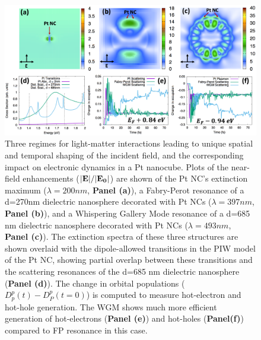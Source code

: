 \documentclass[journal=jpclcd,manuscript=article]{achemso}
\begin{document}
\begin{figure}
\begin{center}
\includegraphics[width=6in]{figs/Pt_AllThree_Alternate.png}
\caption{Three regimes for light-matter interactions leading to unique
spatial and temporal shaping of the incident field, and the corresponding
impact on electronic dynamics in a Pt nanocube. Plots of the near-field enhancements (${\bf |E|}/{\bf |E_0|}$) are shown of the
Pt NC's extinction maximum ($\lambda=200 nm$, {\bf Panel (a)}), a Fabry-Perot resonance of a d=270nm dielectric nanosphere decorated with Pt NCs
($\lambda = 397 nm$, {\bf Panel (b)}),
and a Whispering Gallery Mode resonance of a d=685 nm dielectric nanosphere decorated with Pt NCs ($\lambda = 493 nm$, {\bf Panel (c)}).
The extinction spectra of these three structures are shown overlaid with the dipole-allowed transitions in the PIW model of the Pt NC, showing partial
overlap between these transitions and the scattering resonances of the d=685 nm dielectric nanosphere ({\bf Panel (d)}).
The change in orbital populations ($D_p^p(t)-D_P^p(t=0)$) is computed to measure hot-electron and hot-hole generation.
The WGM shows much more efficient generation of hot-electrons ({\bf Panel (e)}) and hot-holes ({\bf Panel(f)}) compared to FP resonance in this case.}
\end{center}
\end{figure}
\end{document}
